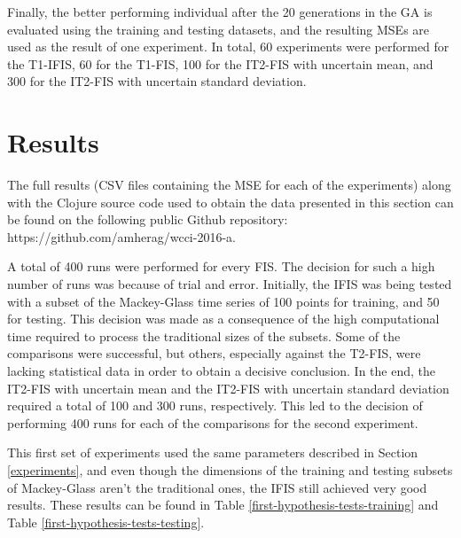 \documentclass[conference]{IEEEtran}
\begin{document}
Finally, the better performing individual after the 20 generations in
the GA is evaluated using the training and testing datasets, and the
resulting MSEs are used as the result of one experiment. In total, 60
experiments were performed for the T1-IFIS, 60 for the T1-FIS, 100 for
the IT2-FIS with uncertain mean, and 300 for the IT2-FIS with
uncertain standard deviation.




\section{Results}
\label{results}

The full results (CSV files containing the MSE for each of the
experiments) along with the Clojure source code used to obtain the
data presented in this section can be found on the following public
Github repository: https://github.com/amherag/wcci-2016-a.

A total of 400 runs were performed for every FIS. The decision for
such a high number of runs was because of trial and error. Initially,
the IFIS was being tested with a subset of the Mackey-Glass time
series of 100 points for training, and 50 for testing. This decision
was made as a consequence of the high computational time required to
process the traditional sizes of the subsets. Some of the
comparisons were successful, but others, especially against the
T2-FIS, were lacking statistical data in order to obtain a decisive
conclusion. In the end, the IT2-FIS with uncertain mean and the
IT2-FIS with uncertain standard deviation required a total of 100 and
300 runs, respectively. This led to the decision of performing 400
runs for each of the comparisons for the second experiment.

This first set of experiments used the same parameters
described in Section \ref{experiments}, and even though the dimensions
of the training and testing subsets of Mackey-Glass aren't the
traditional ones, the IFIS still achieved very good results. These
results can be found in Table \ref{first-hypothesis-tests-training}
and Table \ref{first-hypothesis-tests-testing}.
\end{document}
